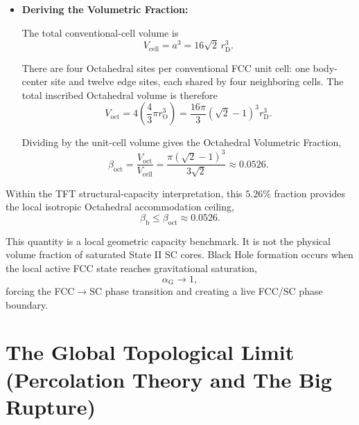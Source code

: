 \begin{itemize}
    \item \textbf{Deriving the Volumetric Fraction:}

    The total conventional-cell volume is
    \begin{equation}
        V_{\mathrm{cell}}
        =
        a^3
        =
        16\sqrt{2}\,
        r_{\mathrm D}^3.
    \end{equation}

    There are four Octahedral sites per conventional FCC unit cell: one
    body-center site and twelve edge sites, each shared by four neighboring
    cells. The total inscribed Octahedral volume is therefore
    \begin{equation}
        V_{\mathrm{oct}}
        =
        4
        \left(
            \frac{4}{3}
            \pi
            r_{\mathrm O}^3
        \right)
        =
        \frac{16\pi}{3}
        (\sqrt{2}-1)^3
        r_{\mathrm D}^3.
    \end{equation}

    Dividing by the unit-cell volume gives the Octahedral Volumetric Fraction,
    \begin{equation}
        \beta_{\mathrm{oct}}
        =
        \frac{
            V_{\mathrm{oct}}
        }{
            V_{\mathrm{cell}}
        }
        =
        \frac{
            \pi(\sqrt{2}-1)^3
        }{
            3\sqrt{2}
        }
        \approx
        0.0526.
    \end{equation}

\end{itemize}

Within the TFT structural-capacity interpretation, this \(5.26\%\) fraction
provides the local isotropic Octahedral accommodation ceiling,
\begin{equation}
    \beta_{\mathrm b}
    \leq
    \beta_{\mathrm{oct}}
    \approx
    0.0526.
\end{equation}

This quantity is a local geometric capacity benchmark. It is not the physical
volume fraction of saturated State II SC cores. Black Hole formation occurs
when the local active FCC state reaches gravitational saturation,
\begin{equation}
    \alpha_{\mathrm G}
    \rightarrow
    1,
\end{equation}
forcing the FCC$\rightarrow$SC phase transition and creating a live FCC/SC
phase boundary.


\section{The Global Topological Limit
(Percolation Theory and The Big Rupture)}

